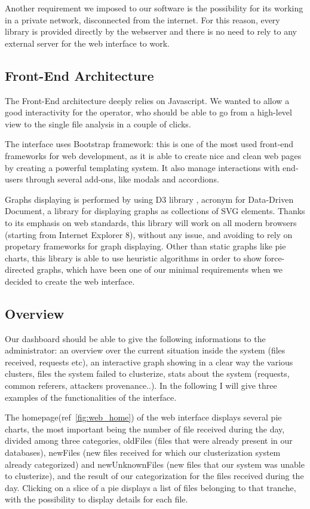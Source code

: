 Another requirement we imposed to our software is the possibility for its working in a private network, disconnected from the internet. For this reason, every library is provided directly by the webserver and there is no need to rely to any external server for the web interface to work.

\subsection{Front-End Architecture}

The Front-End architecture deeply relies on Javascript. We wanted to allow a good interactivity for the operator, who should be able to go from a high-level view to the single file analysis in a couple of clicks.

The interface uses Bootstrap \cite{bootstrap} framework: this is one of the most used front-end frameworks for web development, as it is able to create nice and clean web pages by creating a powerful templating system. It also manage interactions with end-users through several add-ons, like modals and accordions.

Graphs displaying is performed by using D3 library \cite{d3_home}, acronym for Data-Driven Document, a library for displaying graphs as collections of SVG elements. Thanks to its emphasis on web standards, this library will work on all modern browsers (starting from Internet Explorer 8), without any issue, and avoiding to rely on propetary frameworks for graph displaying. Other than static graphs like pie charts, this library is able to use heuristic algorithms in order  to show force-directed graphs, which have been one of our minimal requirements when we decided to create the web interface.

\subsection{Overview}

Our dashboard should be able to give the following informations to the administrator: an overview over the current situation inside the system (files received, requests etc), an interactive graph showing in a clear way the various clusters, files the system failed to clusterize, stats about the system (requests, common referers, attackers provenance..). In the following I will give three examples of the functionalities of the interface.

The homepage(ref~\ref{fig:web_home}) of the web interface displays several pie charts, the most important being the number of file received during the day, divided among three categories, oldFiles (files that were already present in our databases), newFiles (new files received for which our clusterization system already categorized) and newUnknownFiles (new files that our system was unable to clusterize), and the result of our categorization for the files received during the day. Clicking on a slice of a pie displays a list of files belonging to that tranche, with the possibility to display details for each file.

